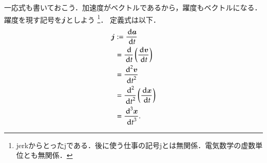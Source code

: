         一応式も書いておこう．加速度がベクトルであるから，躍度もベクトルになる．
        躍度を現す記号を$\boldsymbol{j}$としよう
            \footnote{
                jerkからとったjである．後に使う仕事の記号jとは無関係．電気数学の虚数単位とも無関係．
            }．
        定義式は以下．
            \begin{align}\label{eq:jerk_define}
                \bj &:= \frac{\df \ba}{\df t} \\
                    &=  \frac{\df }{\df t} \left(\frac{\df \bv}{\df t}\right) \notag \\
                    &=  \frac{{\df}^{2} \bv}{{\df t}^{2}} \notag \\
                    &=  \frac{{\df}^{2} }{{\df t}^{2}} \left( \frac{\df \bx}{\df t} \right) \notag \\
                    &=  \frac{{\df}^{3} \bx}{{\df t}^{3}}. \notag
            \end{align}



